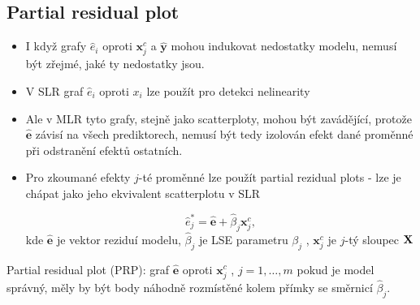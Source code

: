 \subsection{Partial residual plot}
\begin{itemize}
\item I když grafy $ \widehat{e}_i $ oproti $ \textbf{x}_j^c $ a $ \widehat{\textbf{y}} $ mohou indukovat nedostatky modelu, nemusí být zřejmé, jaké ty nedostatky jsou.
\item V SLR graf $ \widehat{e}_i $ oproti $ x_i $ lze použít pro detekci nelinearity
\item Ale v MLR tyto grafy, stejně jako scatterploty, mohou být zavádějící, protože $ \widehat{\textbf{e}} $ závisí na všech prediktorech, nemusí být tedy izolován efekt dané proměnné při odstranění efektů ostatních.
\item Pro zkoumané efekty $ j $-té proměnné lze použít partial rezidual plots - lze je chápat jako jeho ekvivalent scatterplotu v SLR

\begin{define}
 $$
   \widehat{e}_j^* = \widehat{\textbf{e}} + \widehat{\beta}_j \textbf{x}_j^c,
 $$
 kde $ \widehat{\textbf{e}} $ je vektor reziduí modelu, $ \widehat{\beta}_j $ je LSE parametru $ \beta_j $ , $ \textbf{x}_j^c $ je $ j $-tý sloupec $ \textbf{X} $
\end{define}
\end{itemize}
Partial residual plot (PRP): graf $ \widehat{\textbf{e}} $ oproti $ \textbf{x}_j^c $ , $ j = 1, \dots , m $ pokud je model správný, měly by být body náhodně rozmístěné kolem přímky se směrnicí $ \widehat{\beta}_j $.